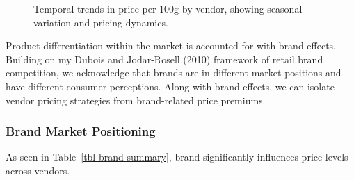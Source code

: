 \documentclass[
  letterpaper,
  DIV=11,
  numbers=noendperiod]{scrartcl}
\begin{document}
\begin{figure}[H]


\caption{\label{fig-temporal-trends}Temporal trends in price per 100g by
vendor, showing seasonal variation and pricing dynamics.}

\end{figure}%

Product differentiation within the market is accounted for with brand
effects. Building on my Dubois and Jodar-Rosell (2010) framework of
retail brand competition, we acknowledge that brands are in different
market positions and have different consumer perceptions. Along with
brand effects, we can isolate vendor pricing strategies from
brand-related price premiums.

\subsubsection{Brand Market Positioning}\label{brand-market-positioning}

As seen in Table~\ref{tbl-brand-summary}, brand significantly influences
price levels across vendors.
\end{document}
